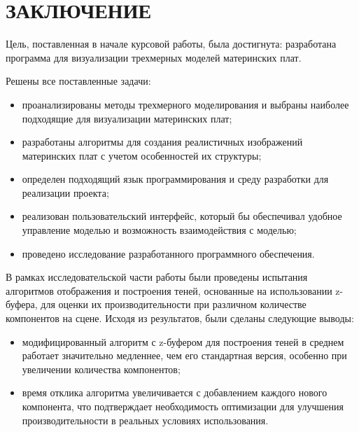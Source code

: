 \chapter*{ЗАКЛЮЧЕНИЕ}

Цель, поставленная в начале курсовой работы, была достигнута: разработана программа для визуализации трехмерных моделей материнских плат.

Решены все поставленные задачи:
\begin{itemize}[label=---]
	\item проанализированы методы трехмерного моделирования и выбраны наиболее подходящие для визуализации материнских плат;
	\item разработаны алгоритмы для создания реалистичных изображений материнских плат с учетом особенностей их структуры;
	\item определен подходящий язык программирования и среду разработки для реализации проекта;
	\item реализован пользовательский интерфейс, который бы обеспечивал удобное управление моделью и возможность взаимодействия с моделью;
	\item проведено исследование разработанного программного обеспечения.
\end{itemize}

В рамках исследовательской части работы были проведены испытания алгоритмов отображения и построения теней, основанные на использовании z-буфера, для оценки их производительности при различном количестве компонентов на сцене. Исходя из результатов, были сделаны следующие выводы:
\begin{itemize}[label=---]
	\item модифицированный алгоритм с z-буфером для построения теней в среднем работает значительно медленнее, чем его стандартная версия, особенно при увеличении количества компонентов;
	\item время отклика алгоритма увеличивается с добавлением каждого нового компонента, что подтверждает необходимость оптимизации для улучшения производительности в реальных условиях использования.
\end{itemize}
